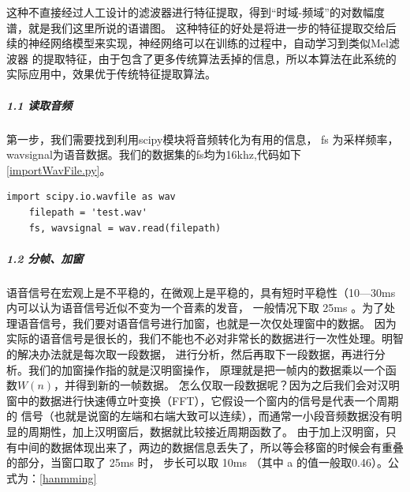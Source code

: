 \documentclass[12pt,a4paper,fancyhdr,openany,oneside]{ctexbook}
\begin{document}
这种不直接经过人工设计的滤波器进行特征提取，得到“时域-频域”的对数幅度谱，就是我们这里所说的语谱图。
这种特征的好处是将进一步的特征提取交给后续的神经网络模型来实现，神经网络可以在训练的过程中，自动学习到类似Mel滤波器
的提取特征，由于包含了更多传统算法丢掉的信息，所以本算法在此系统的实际应用中，效果优于传统特征提取算法。


\subparagraph{1.1 读取音频} 第一步，我们需要找到利用scipy模块将音频转化为有用的信息， fs 为采样频率，
wavsignal为语音数据。我们的数据集的fs均为16khz,代码如下\ref{importWavFile.py}。
\begin{lstlisting}[style=Python,
    caption={importWavFile.py},
    label={importWavFile.py}]
    import scipy.io.wavfile as wav
    filepath = 'test.wav'
    fs, wavsignal = wav.read(filepath)
\end{lstlisting}


\subparagraph{1.2 分帧、加窗} 
语音信号在宏观上是不平稳的，在微观上是平稳的，具有短时平稳性（10—30ms内可以认为语音信号近似不变为一个音素的发音，
一般情况下取 25ms 。为了处理语音信号，我们要对语音信号进行加窗，也就是一次仅处理窗中的数据。
因为实际的语音信号是很长的，我们不能也不必对非常长的数据进行一次性处理。明智的解决办法就是每次取一段数据，
进行分析，然后再取下一段数据，再进行分析。我们的加窗操作指的就是汉明窗操作，
原理就是把一帧内的数据乘以一个函数$ W\left ( n \right ) $，并得到新的一帧数据。
怎么仅取一段数据呢？因为之后我们会对汉明窗中的数据进行快速傅立叶变换（FFT），它假设一个窗内的信号是代表一个周期的
信号（也就是说窗的左端和右端大致可以连续），而通常一小段音频数据没有明显的周期性，加上汉明窗后，数据就比较接近周期函数了。
由于加上汉明窗，只有中间的数据体现出来了，两边的数据信息丢失了，所以等会移窗的时候会有重叠的部分，当窗口取了 25ms 时，
步长可以取 10ms （其中 a 的值一般取0.46）。公式为：\ref{hanmming}
\end{document}
